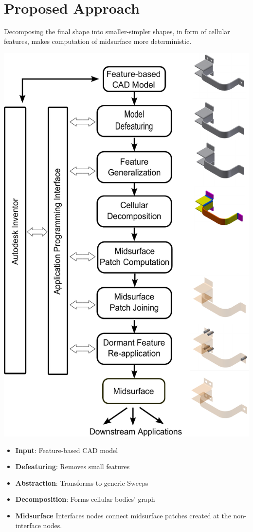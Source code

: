 \section{Proposed Approach}

 Decomposing the final shape into smaller-simpler shapes, in form of cellular features, makes computation of midsurface more deterministic. 
 
\vspace{0.5em}

\includegraphics[height=1.05\linewidth]{../Common/images/SystemArchitecture_nolabels_7.pdf}
\vspace{0.5em}

\begin{itemize}[noitemsep,nolistsep]
		\item \textbf{Input}: Feature-based CAD model
		\item \textbf{Defeaturing}: Removes small features
		\item \textbf{Abstraction}: Transforms to generic Sweeps
		\item \textbf{Decomposition}: Forms cellular bodies' graph
		\item \textbf{Midsurface} Interfaces nodes connect midsurface patches created at the non-interface nodes.
\end{itemize}

